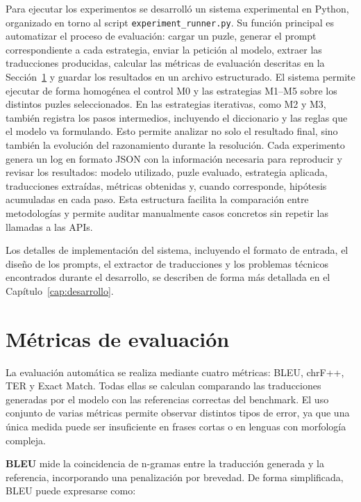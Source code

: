 Para ejecutar los experimentos se desarrolló un sistema experimental en Python, organizado en torno al script \texttt{experiment\_runner.py}. Su función principal es automatizar el proceso de evaluación: cargar un puzle, generar el prompt correspondiente a cada estrategia, enviar la petición al modelo, extraer las traducciones producidas, calcular las métricas de evaluación descritas en la Sección~\ref{sec:metricas} y guardar los resultados en un archivo estructurado. El sistema permite ejecutar de forma homogénea el control M0 y las estrategias M1--M5 sobre los distintos puzles seleccionados. En las estrategias iterativas, como M2 y M3, también registra los pasos intermedios, incluyendo el diccionario y las reglas que el modelo va formulando. Esto permite analizar no solo el resultado final, sino también la evolución del razonamiento durante la resolución. Cada experimento genera un log en formato JSON con la información necesaria para reproducir y revisar los resultados: modelo utilizado, puzle evaluado, estrategia aplicada, traducciones extraídas, métricas obtenidas y, cuando corresponde, hipótesis acumuladas en cada paso. Esta estructura facilita la comparación entre metodologías y permite auditar manualmente casos concretos sin repetir las llamadas a las APIs.

Los detalles de implementación del sistema, incluyendo el formato de entrada, el diseño de los prompts, el extractor de traducciones y los problemas técnicos encontrados durante el desarrollo, se describen de forma más detallada en el Capítulo~\ref{cap:desarrollo}.

\section{Métricas de evaluación}
\label{sec:metricas}

La evaluación automática se realiza mediante cuatro métricas: BLEU, chrF++, TER y Exact Match. Todas ellas se calculan comparando las traducciones generadas por el modelo con las referencias correctas del benchmark. El uso conjunto de varias métricas permite observar distintos tipos de error, ya que una única medida puede ser insuficiente en frases cortas o en lenguas con morfología compleja.

\textbf{BLEU} \citep{papineni2002bleu} mide la coincidencia de n-gramas entre la traducción generada y la referencia, incorporando una penalización por brevedad. De forma simplificada, BLEU puede expresarse como:

